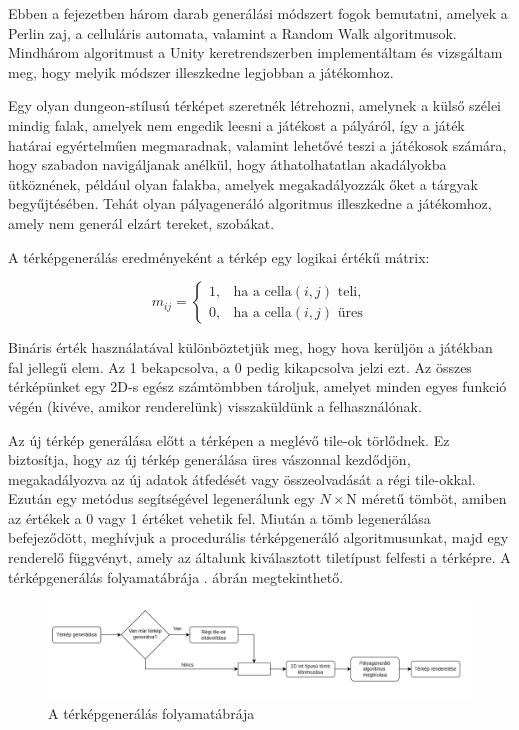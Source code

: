 
Ebben a fejezetben három darab generálási módszert fogok bemutatni, amelyek a Perlin zaj, a celluláris automata, valamint a Random Walk algoritmusok. Mindhárom algoritmust a Unity keretrendszerben implementáltam és vizsgáltam meg, hogy melyik módszer illeszkedne legjobban a játékomhoz.


Egy olyan dungeon-stílusú térképet szeretnék létrehozni, amelynek a külső szélei mindig falak, amelyek nem engedik leesni a játékost a pályáról, így a játék határai egyértelműen megmaradnak, valamint lehetővé teszi a játékosok számára, hogy szabadon navigáljanak anélkül, hogy áthatolhatatlan akadályokba ütköznének, például olyan falakba, amelyek megakadályozzák őket a tárgyak begyűjtésében. Tehát olyan pályageneráló algoritmus illeszkedne a játékomhoz, amely nem generál elzárt tereket, szobákat.

A térképgenerálás eredményeként a térkép egy logikai értékű mátrix:

\[
m_{ij} = 
\begin{cases} 
1, & \text{ha a cella} (i,j) \text{ teli,} \\
0, & \text{ha a cella} (i,j) \text{ üres}
\end{cases}
\]

Bináris érték használatával különböztetjük meg, hogy hova kerüljön a játékban fal jellegű elem. Az 1 bekapcsolva, a 0 pedig kikapcsolva jelzi ezt. Az összes térképünket egy 2D-s egész számtömbben tároljuk, amelyet minden egyes funkció végén (kivéve, amikor renderelünk) visszaküldünk a felhasználónak.\cite{mapgenerator}

Az új térkép generálása előtt a térképen a meglévő tile-ok törlődnek. Ez biztosítja, hogy az új térkép generálása üres vászonnal kezdődjön, megakadályozva az új adatok átfedését vagy összeolvadását a régi tile-okkal. Ezután egy metódus segítségével legenerálunk egy $N \times $N méretű tömböt, amiben az értékek a 0 vagy 1 értéket vehetik fel. Miután a tömb legenerálása befejeződött, meghívjuk a procedurális térképgeneráló algoritmusunkat, majd egy renderelő függvényt, amely az általunk kiválasztott tiletípust felfesti a térképre. A térképgenerálás folyamatábrája . ábrán megtekinthető.\cite{mapgenerator}

\begin{figure}[ht]
\centering
\includegraphics[width=\textwidth]{images/generationflowchart.png}
\caption{A térképgenerálás folyamatábrája}
\label{fig:generationflowchart}
\end{figure}

